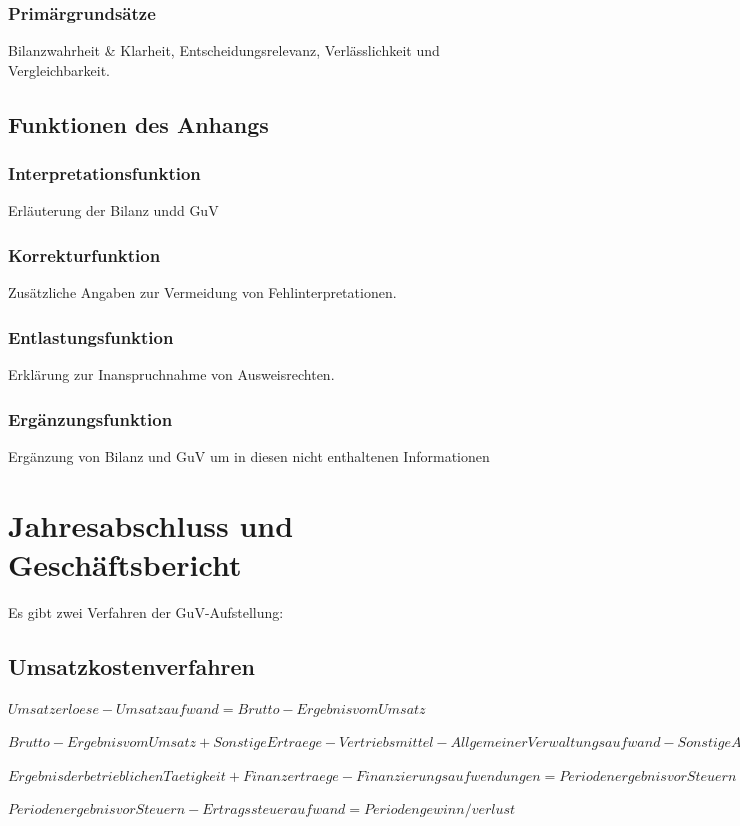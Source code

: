 \documentclass{article}
\begin{document}
\subsubsection{Primärgrundsätze}
Bilanzwahrheit \& Klarheit, Entscheidungsrelevanz, Verlässlichkeit und Vergleichbarkeit.
\subsection{Funktionen des Anhangs}
\subsubsection{Interpretationsfunktion}
Erläuterung der Bilanz undd GuV

\subsubsection{Korrekturfunktion}
Zusätzliche Angaben zur Vermeidung von Fehlinterpretationen.

\subsubsection{Entlastungsfunktion}
Erklärung zur Inanspruchnahme von Ausweisrechten.

\subsubsection{Ergänzungsfunktion}
Ergänzung von Bilanz und GuV um in diesen nicht enthaltenen Informationen


\section{Jahresabschluss und Geschäftsbericht}

Es gibt zwei Verfahren der GuV-Aufstellung:

\subsection{Umsatzkostenverfahren}

\begin{center}
$Umsatzerloese - Umsatzaufwand = Brutto-Ergebnis vom Umsatz$ 
\end{center}
\begin{center}
 $Brutto-Ergebnis vom Umsatz + Sonstige Ertraege - Vertriebsmittel - Allgemeiner Verwaltungsaufwand - Sonstige Aufwendungen = Ergebnis der betrieblichen Taetigkeit  $
\end{center}
\begin{center}
$ Ergebnis der betrieblichen Taetigkeit + Finanzertraege - Finanzierungsaufwendungen = Periodenergebnis vor Steuern $
\end{center}
\begin{center}
$ Periodenergebnis vor Steuern - Ertragssteueraufwand = Periodengewinn/verlust $
\end{center} 
\end{document}
